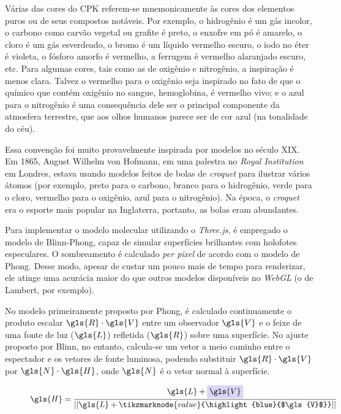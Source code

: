 Várias das cores do \gls{CPK} referem-se mnemonicamente às cores dos elementos puros ou de seus compostos notáveis. Por exemplo, o hidrogênio é um gás incolor, o carbono como carvão vegetal ou grafite é preto, o enxofre em pó é amarelo, o cloro é um gás esverdeado, o bromo é um líquido vermelho escuro, o iodo no éter é violeta, o fósforo amorfo é vermelho, a ferrugem é vermelho alaranjado escuro, etc. Para algumas cores, tais como as de oxigênio e nitrogênio, a inspiração é menos clara. Talvez o vermelho para o oxigênio seja inspirado no fato de que o químico que contém oxigênio no sangue, hemoglobina, é vermelho vivo; e o azul para o nitrogênio é uma consequência dele ser o principal componente da atmosfera terrestre, que aos olhos humanos parece ser de cor azul (na tonalidade do céu).

Essa convenção foi muito provavelmente inspirada por modelos no século XIX. Em 1865, August Wilhelm von Hofmann, em uma palestra no \textit{Royal Institution} em Londres, estava usando modelos feitos de bolas de \textit{croquet} para ilustrar vários átomos (por exemplo, preto para o carbono, branco para o hidrogênio, verde para o cloro, vermelho para o oxigênio, azul para o nitrogênio)\autocite{Crossland2004-ll}. Na época, o \textit{croquet} era o esporte mais popular na Inglaterra, portanto, as bolas eram abundantes.

Para implementar o modelo molecular utilizando o \textit{Three.js}, é empregado o modelo de Blinn-Phong, capaz de simular superfícies brilhantes com holofotes especulares. O sombreamento é calculado \textit{per pixel} de acordo com o modelo de Phong. Desse modo, apesar de custar um pouco mais de tempo para renderizar, ele atinge uma acurácia maior do que outros modelos disponíveis no \textit{WebGL} (o de Lambert, por exemplo).

No modelo primeiramente proposto por Phong, é calculado continuamente o produto escalar $\gls{R} \cdot \gls{V}$ entre um observador $\gls{V}$ e o feixe de uma fonte de luz ($\gls{L}$) refletida ($\gls{R}$) sobre uma superfície. No ajuste proposto por Blinn, no entanto, calcula-se um vetor a meio caminho entre o espectador e os vetores de fonte luminosa, podendo substituir $\gls{R} \cdot \gls{V}$ por $\gls{N} \cdot \gls{H}$, onde $\gls{N}$ é o vetor normal à superfície.

\begin{figure}[htb]
\begin{equation}
    \label{eq:R1}
    \gls{H} = \frac{\gls{L} + \highlight{blue}{$\gls{V}$} }{||\gls{L} + \tikzmarknode{value}{\highlight{blue}{$\gls{V}$}}||}
\end{equation}
\vspace{2\baselineskip}
\end{figure}

